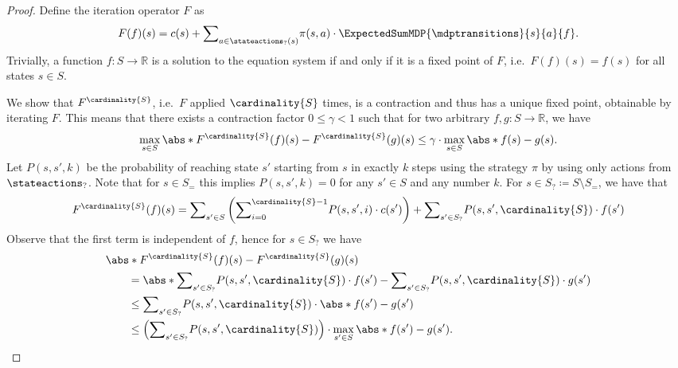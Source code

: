 \documentclass{article}
\newcommand{\Reals}{\mathbb{R}}
\newcommand{\States}{S}
\newcommand{\strategy}{\pi}
\begin{document}
\begin{proof}
	Define the iteration operator $F$ as
	\begin{align*}
		F(f)(s) = c(s) + {\sum}_{a \in \stateactions_?(s)} \strategy(s, a) \cdot \ExpectedSumMDP{\mdptransitions}{s}{a}{f}.
	\end{align*}
	Trivially, a function $f : \States \to \Reals$ is a solution to the equation system if and only if it is a fixed point of $F$, i.e.\ $F(f)(s) = f(s)$ for all states $s \in \States$.

	We show that $F^{\cardinality{\States}}$, i.e.\ $F$ applied $\cardinality{S}$ times, is a contraction and thus has a unique fixed point, obtainable by iterating $F$.
	This means that there exists a contraction factor $0 \leq \gamma < 1$ such that for two arbitrary $f, g : \States \to \Reals$, we have
	\begin{equation}
		\max_{s \in \States} \abs*{F^{\cardinality{\States}}(f)(s) - F^{\cardinality{\States}}(g)(s)} \leq \gamma \cdot \max_{s \in \States} \abs*{f(s) - g(s)}. \label{eq:stm:bellman_unique_solution:contraction}
	\end{equation}
	Let $P(s, s', k)$ be the probability of reaching state $s'$ starting from $s$ in exactly $k$ steps using the strategy $\strategy$ by using only actions from $\stateactions_?$.
	Note that for $s \in \States_=$ this implies $P(s, s', k) = 0$ for any $s' \in \States$ and any number $k$.
	For $s \in \States_? \coloneqq \States \setminus \States_=$, we have that
	\begin{equation*}
		F^{\cardinality{S}}(f)(s) = {\sum}_{s' \in \States} \left( {\sum}_{i = 0}^{\cardinality{S} - 1} P(s, s', i) \cdot c(s') \right) + {\sum}_{s' \in \States_?} P(s, s', \cardinality{S}) \cdot f(s')
	\end{equation*}
	Observe that the first term is independent of $f$, hence for $s \in S_?$ we have
	\begin{align*}
		& \abs*{F^{\cardinality{\States}}(f)(s) - F^{\cardinality{\States}}(g)(s)} \\
		& \qquad = \abs*{{\sum}_{s' \in \States_?} P(s, s', \cardinality{S}) \cdot f(s') - {\sum}_{s' \in \States_?} P(s, s', \cardinality{S}) \cdot g(s')} \\
		& \qquad \leq {\sum}_{s' \in \States_?} P(s, s', \cardinality{S}) \cdot \abs*{f(s') - g(s')} \\
		& \qquad \leq \left( {\sum}_{s' \in \States_?} P(s, s', \cardinality{S})  \right) \cdot \max_{s' \in \States} \abs*{f(s') - g(s')}.
	\end{align*}

\end{proof}
\end{document}
